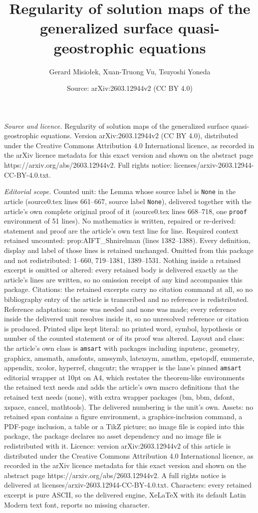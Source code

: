 \documentclass[10pt,a4paper]{amsart}
\title[Regularity of solution maps of the generalized surface quasi]{Regularity of solution maps of the generalized surface quasi-geostrophic equations}
\author{Gerard Misio{\l}ek, Xuan-Truong Vu, Tsuyoshi Yoneda}
\date{Source: arXiv:2603.12944v2 (CC BY 4.0)}
\begin{document}
\maketitle

\noindent\emph{Source and licence.} Regularity of solution maps of the generalized surface quasi-geostrophic equations. Version arXiv:2603.12944v2 (CC BY 4.0), distributed under the Creative Commons Attribution 4.0 International licence, as recorded in the arXiv licence metadata for this exact version and shown on the abstract page https://arxiv.org/abs/2603.12944v2. Full rights notice: licenses/arxiv-2603.12944-CC-BY-4.0.txt.\par\smallskip

\noindent\textit{Editorial scope.} Counted unit: the Lemma whose source label is \texttt{None} in the article (source0.tex lines 661--667, source label \texttt{None}), delivered together with the article's own complete original proof of it (source0.tex lines 668--718, one \texttt{proof} environment of 51 lines). No mathematics is written, repaired or re-derived: statement and proof are the article's own text line for line. Required context retained uncounted: prop:AIFT\_Shnirelman (lines 1382--1388). Every definition, display and label of those lines is retained unchanged. Omitted from this package and not redistributed: 1--660, 719--1381, 1389--1531. Nothing inside a retained excerpt is omitted or altered: every retained body is delivered exactly as the article's lines are written, so no omission receipt of any kind accompanies this package. Citations: the retained excerpts carry no citation command at all, so no bibliography entry of the article is transcribed and no reference is redistributed. Reference adaptation: none was needed and none was made; every reference inside the delivered unit resolves inside it, so no unresolved reference or citation is produced. Printed slips kept literal: no printed word, symbol, hypothesis or number of the counted statement or of its proof was altered. Layout and class: the article's own class is \texttt{amsart} with packages including inputenc, geometry, graphicx, amsmath, amsfonts, amssymb, latexsym, amsthm, epstopdf, enumerate, appendix, xcolor, hyperref, chngcntr; the wrapper is the lane's pinned \texttt{amsart} editorial wrapper at 10pt on A4, which restates the theorem-like environments the retained text needs and adds the article's own macro definitions that the retained text needs (none), with extra wrapper packages (bm, bbm, dsfont, xspace, cancel, mathtools). The delivered numbering is the unit's own. Assets: no retained span contains a figure environment, a graphics-inclusion command, a PDF-page inclusion, a table or a TikZ picture; no image file is copied into this package, the package declares no asset dependency and no image file is redistributed with it. Licence: version arXiv:2603.12944v2 of this article is distributed under the Creative Commons Attribution 4.0 International licence, as recorded in the arXiv licence metadata for this exact version and shown on the abstract page https://arxiv.org/abs/2603.12944v2. A full rights notice is delivered at licenses/arxiv-2603.12944-CC-BY-4.0.txt. Characters: every retained excerpt is pure ASCII, so the delivered engine, XeLaTeX with its default Latin Modern text font, reports no missing character.
\end{document}

